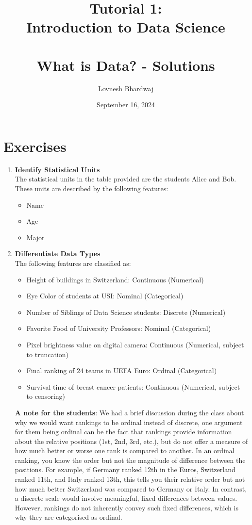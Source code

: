 \documentclass{article}
\title{{\normalsize Tutorial 1:} \\ Introduction to Data Science \\~~\\ {\bf What is Data? - Solutions} }
\author{Lovnesh Bhardwaj}
\date{September 16, 2024}
\begin{document}
\maketitle

\section*{Exercises}

\begin{enumerate}

\item 
{\bf Identify Statistical Units}\\
The statistical units in the table provided are the students Alice and Bob. These units are described by the following features:
\begin{itemize}
	\item Name
	\item Age
	\item Major
\end{itemize}


\item
{\bf Differentiate Data Types}\\
The following features are classified as:
\begin{itemize}
    \item Height of buildings in Switzerland: Continuous (Numerical)
    \item Eye Color of students at USI:  Nominal (Categorical)
    \item Number of Siblings of Data Science students: Discrete (Numerical)
    \item Favorite Food of University Professors:  Nominal (Categorical)
    \item Pixel brightness value on digital camera: Continuous (Numerical, subject to truncation)
    \item Final ranking of 24 teams in UEFA Euro: Ordinal (Categorical)
    \item Survival time of breast cancer patients: Continuous (Numerical, subject to censoring)
\end{itemize}
\textbf{A note for the students}: We had a brief discussion during the class about why we would want rankings to be
	ordinal instead of discrete, one argument for them being ordinal can be the fact that rankings
	provide information about the relative positions (1st, 2nd, 3rd, etc.), but do not offer a measure
	of how much better or worse one rank is compared to another. In an ordinal ranking, you know the order 
	but not the magnitude of difference between the positions. For example, if Germany ranked 12th in the 
	Euros, Switzerland ranked 11th, and Italy ranked 13th, this tells you their relative order but not how
	much better Switzerland was compared to Germany or Italy. In contrast, a discrete scale would involve
	meaningful, fixed differences between values. However, rankings do not inherently convey such fixed differences,
	which is why they are categorised as ordinal.


\end{enumerate}
\end{document}

